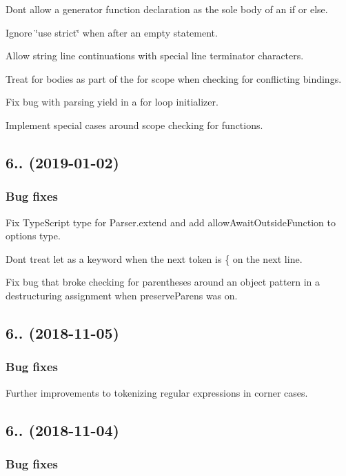 Don\textquotesingle{}t allow a generator function declaration as the sole body of an {\ttfamily if} or {\ttfamily else}.

Ignore {\ttfamily \char`\"{}use strict\char`\"{}} when after an empty statement.

Allow string line continuations with special line terminator characters.

Treat {\ttfamily for} bodies as part of the {\ttfamily for} scope when checking for conflicting bindings.

Fix bug with parsing {\ttfamily yield} in a {\ttfamily for} loop initializer.

Implement special cases around scope checking for functions.

\subsection*{6.. (2019-\/01-\/02)}

\subsubsection*{Bug fixes}

Fix Type\+Script type for {\ttfamily Parser.\+extend} and add {\ttfamily allow\+Await\+Outside\+Function} to options type.

Don\textquotesingle{}t treat {\ttfamily let} as a keyword when the next token is {\ttfamily \{} on the next line.

Fix bug that broke checking for parentheses around an object pattern in a destructuring assignment when {\ttfamily preserve\+Parens} was on.

\subsection*{6.. (2018-\/11-\/05)}

\subsubsection*{Bug fixes}

Further improvements to tokenizing regular expressions in corner cases.

\subsection*{6.. (2018-\/11-\/04)}

\subsubsection*{Bug fixes}

